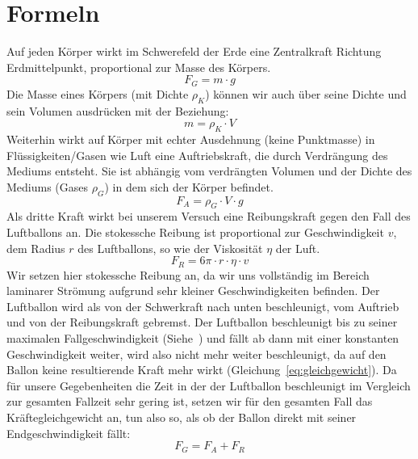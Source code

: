 \documentclass{article}
\begin{document}
    \section{Formeln}
      Auf jeden Körper wirkt im Schwerefeld der Erde eine Zentralkraft Richtung Erdmittelpunkt, proportional zur Masse des Körpers.
      \begin{equation} \label{eq:schwerkraft}
          F_G = m \cdot g
      \end{equation}
      Die Masse eines Körpers (mit Dichte \(\rho_K\)) können wir auch über seine Dichte und sein Volumen ausdrücken mit der Beziehung:
      \begin{equation} \label{eq:masse_dichte_rel}
          m = \rho_K \cdot V
      \end{equation}
      Weiterhin wirkt auf Körper mit echter Ausdehnung (keine Punktmasse) in Flüssigkeiten/Gasen wie Luft eine Auftriebskraft,
      die durch Verdrängung des Mediums entsteht. Sie ist abhängig vom verdrängten Volumen und der Dichte des Mediums (Gases \(\rho_G\)) in dem sich der Körper befindet.
      \begin{equation} \label{eq:auftrieb}
          F_A = \rho_{G} \cdot V \cdot g
      \end{equation}
      Als dritte Kraft wirkt bei unserem Versuch eine Reibungskraft gegen den Fall des Luftballons an.
      Die stokessche Reibung ist proportional zur Geschwindigkeit \(v\), dem Radius \(r\) des Luftballons, so wie der Viskosität \( \eta \) der Luft.
      \begin{equation} \label{eq:stokes_reibung}
          F_R = 6 \pi \cdot r \cdot \eta \cdot v
      \end{equation}
      Wir setzen hier stokessche Reibung an, da wir uns vollständig im Bereich laminarer Strömung aufgrund sehr kleiner Geschwindigkeiten befinden.
      Der Luftballon wird als von der Schwerkraft nach unten beschleunigt, vom Auftrieb und von der Reibungskraft gebremst.
      Der Luftballon beschleunigt bis zu seiner maximalen Fallgeschwindigkeit (Siehe~\cite{Fall-Luftwiederstand}) und fällt ab dann mit einer konstanten Geschwindigkeit weiter,
      wird also nicht mehr weiter beschleunigt, da auf den Ballon keine resultierende Kraft mehr wirkt (Gleichung~\ref{eq:gleichgewicht}).
      Da für unsere Gegebenheiten die Zeit in der der Luftballon beschleunigt im Vergleich zur gesamten Fallzeit sehr gering ist,
      setzen wir für den gesamten Fall das Kräftegleichgewicht an, tun also so, als ob der Ballon direkt mit seiner Endgeschwindigkeit fällt:
      \begin{equation} \label{eq:gleichgewicht}
          F_G = F_A + F_R
      \end{equation}
\end{document}
